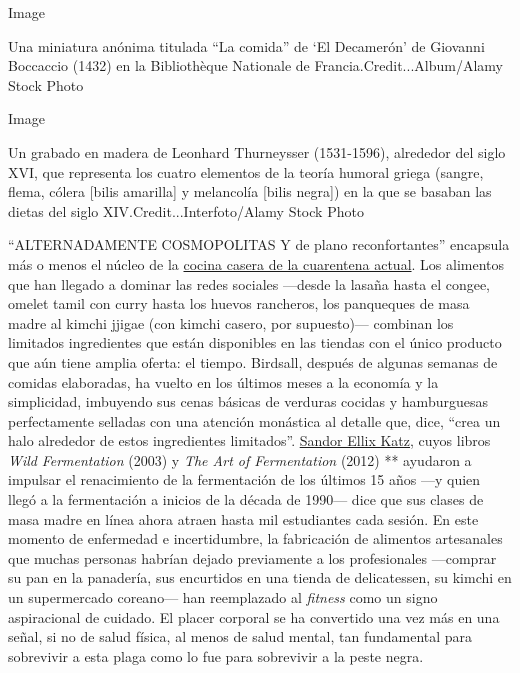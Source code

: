 Image

Una miniatura anónima titulada ``La comida'' de `El Decamerón' de
Giovanni Boccaccio (1432) en la Bibliothèque Nationale de
Francia.Credit...Album/Alamy Stock Photo

Image

Un grabado en madera de Leonhard Thurneysser (1531-1596), alrededor del
siglo XVI, que representa los cuatro elementos de la teoría humoral
griega (sangre, flema, cólera {[}bilis amarilla{]} y melancolía {[}bilis
negra{]}) en la que se basaban las dietas del siglo
XIV.Credit...Interfoto/Alamy Stock Photo

``ALTERNADAMENTE COSMOPOLITAS Y de plano reconfortantes'' encapsula más
o menos el núcleo de la
\href{https://www.nytimes.com/article/recipes-cooking-tips-coronavirus.html}{cocina
casera de la cuarentena actual}. Los alimentos que han llegado a dominar
las redes sociales ---desde la lasaña hasta el congee, omelet tamil con
curry hasta los huevos rancheros, los panqueques de masa madre al kimchi
jjigae (con kimchi casero, por supuesto)--- combinan los limitados
ingredientes que están disponibles en las tiendas con el único producto
que aún tiene amplia oferta: el tiempo. Birdsall, después de algunas
semanas de comidas elaboradas, ha vuelto en los últimos meses a la
economía y la simplicidad, imbuyendo sus cenas básicas de verduras
cocidas y hamburguesas perfectamente selladas con una atención monástica
al detalle que, dice, ``crea un halo alrededor de estos ingredientes
limitados''.
\href{https://www.wildfermentation.com/who-is-sandorkraut/}{Sandor Ellix
Katz}, cuyos libros \emph{Wild} \emph{Fermentation} (2003) y \emph{The
Art of Fermentation} (2012) ** ayudaron a impulsar el renacimiento de la
fermentación de los últimos 15 años ---y quien llegó a la fermentación a
inicios de la década de 1990--- dice que sus clases de masa madre en
línea ahora atraen hasta mil estudiantes cada sesión. En este momento de
enfermedad e incertidumbre, la fabricación de alimentos artesanales que
muchas personas habrían dejado previamente a los profesionales
---comprar su pan en la panadería, sus encurtidos en una tienda de
delicatessen, su kimchi en un supermercado coreano--- han reemplazado al
\emph{fitness} como un signo aspiracional de cuidado. El placer corporal
se ha convertido una vez más en una señal, si no de salud física, al
menos de salud mental, tan fundamental para sobrevivir a esta plaga como
lo fue para sobrevivir a la peste negra.

